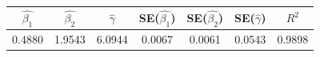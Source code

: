 \begin{tabular}{ccccccc}
\toprule
$\hat{\beta_1}$ & $\hat{\beta_2}$ & $\hat{\gamma}$ & SE($\hat{\beta_1}$) & SE($\hat{\beta_2}$) & SE($\hat{\gamma}$) & $R^2$ \\
\midrule
0.4880 & 1.9543 & 6.0944 & 0.0067 & 0.0061 & 0.0543 & 0.9898 \\
\bottomrule
\end{tabular}